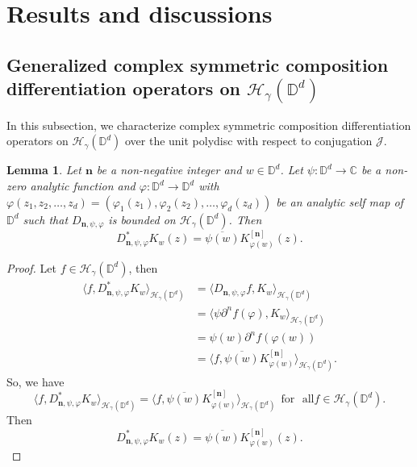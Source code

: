 \documentclass[12pt, reqno]{amsart}
\newtheorem{lemma}[theorem]{Lemma}
\theoremstyle{definition}
\theoremstyle{remark}
\numberwithin{equation}{section}
\newcommand{\mfn}{\mathbf n}
\begin{document}
\section{Results and discussions}


\subsection{Generalized complex symmetric composition differentiation operators on $\mathcal{H}_\gamma(\mathbb{D}^{d})$}

In this subsection, we characterize complex symmetric composition differentiation operators on $\mathcal{H}_\gamma(\mathbb{D}^{d})$ over the unit polydisc with respect to conjugation $\mathcal{J}$.
\begin{lemma}
    Let $\mfn$ be a non-negative integer and $w\in \mathbb{D}^d$. Let $\psi: \mathbb{D}^d\longrightarrow \mathbb{C}$ be a non-zero analytic function and $\varphi: \mathbb{D}^d\longrightarrow \mathbb{D}^d$ with $\varphi(z_1, z_2, \dots, z_d)=(\varphi_1(z_1), \varphi_2(z_2), \dots, \varphi_d(z_d))$ be an analytic self map of $\mathbb{D}^d$ such that $D_{\mfn,\psi,\varphi}$ is bounded on $\mathcal{H}_\gamma(\mathbb{D}^d)$.
    Then $$  D_{\mfn,\psi, \varphi}^*K_w(z)=\overline{\psi(w)}K_{\varphi(w)}^{[\mfn]}(z).$$
\end{lemma}
\begin{proof}
    Let $f\in \mathcal{H}_\gamma(\mathbb{D}^d)$, then
    \begin{align*}
        \langle f,  D_{\mfn,\psi, \varphi}^*K_w \rangle_{\mathcal{H}_\gamma(\mathbb{D}^d)}&=  \langle  D_{\mfn,\psi, \varphi}f, K_w \rangle_{\mathcal{H}_\gamma(\mathbb{D}^d)}\\
        &=\langle \psi \partial^n f(\varphi) , K_w \rangle_{\mathcal{H}_\gamma(\mathbb{D}^d)}\\
        &=\psi(w) \partial^n f(\varphi(w)) \\
        &=\langle  f, \overline{\psi(w)}K_{\varphi(w)}^{[\mfn]} \rangle_{\mathcal{H}_\gamma(\mathbb{D}^d)}.
    \end{align*}
    So, we have
    $$\langle f,  D_{\mfn,\psi, \varphi}^*K_w \rangle_{\mathcal{H}_\gamma(\mathbb{D}^d)}=\langle  f, \overline{\psi(w)}K_{\varphi(w)}^{[\mfn]} \rangle_{\mathcal{H}_\gamma(\mathbb{D}^d)}~~\mbox{for~ all} f\in \mathcal{H}_\gamma(\mathbb{D}^d)    .$$
    Then
     $$  D_{\mfn,\psi, \varphi}^*K_w(z)=\overline{\psi(w)}K_{\varphi(w)}^{[\mfn]}(z).$$
 \end{proof}
\end{document}
